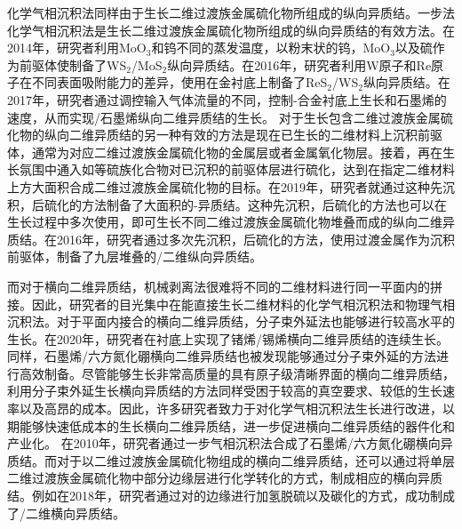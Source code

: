     化学气相沉积法同样由于生长二维过渡族金属硫化物所组成的纵向异质结。一步法化学气相沉积法是生长二维过渡族金属硫化物所组成的纵向异质结的有效方法。在2014年，研究者利用MoO$_3$和钨不同的蒸发温度，以粉末状的钨，MoO$_3$以及硫作为前驱体使制备了WS$_2$/MoS$_2$纵向异质结。在2016年，研究者利用W原子和Re原子在不同表面吸附能力的差异，使用在金衬底上制备了ReS$_2$/WS$_2$纵向异质结。在2017年，研究者通过调控输入气体流量的不同，控制-合金衬底上生长和石墨烯的速度，从而实现/石墨烯纵向二维异质结的生长。
    对于生长包含二维过渡族金属硫化物的纵向二维异质结的另一种有效的方法是现在已生长的二维材料上沉积前驱体，通常为对应二维过渡族金属硫化物的金属层或者金属氧化物层。接着，再在生长氛围中通入如等硫族化合物对已沉积的前驱体层进行硫化，达到在指定二维材料上方大面积合成二维过渡族金属硫化物的目标。在2019年，研究者就通过这种先沉积，后硫化的方法制备了大面积的-异质结。这种先沉积，后硫化的方法也可以在生长过程中多次使用，即可生长不同二维过渡族金属硫化物堆叠而成的纵向二维异质结。在2016年，研究者通过多次先沉积，后硫化的方法，使用过渡金属作为沉积前驱体，制备了九层堆叠的/二维纵向异质结。

    而对于横向二维异质结，机械剥离法很难将不同的二维材料进行同一平面内的拼接。因此，研究者的目光集中在能直接生长二维材料的化学气相沉积法和物理气相沉积法。对于平面内接合的横向二维异质结，分子束外延法也能够进行较高水平的生长。在2020年，研究者在衬底上实现了锗烯/锡烯横向二维异质结的连续生长。同样，石墨烯/六方氮化硼横向二维异质结也被发现能够通过分子束外延的方法进行高效制备。尽管能够生长非常高质量的具有原子级清晰界面的横向二维异质结，利用分子束外延生长横向异质结的方法同样受困于较高的真空要求、较低的生长速率以及高昂的成本。因此，许多研究者致力于对化学气相沉积法生长进行改进，以期能够快速低成本的生长横向二维异质结，进一步促进横向二维异质结的器件化和产业化。
    在2010年，研究者通过一步气相沉积法合成了石墨烯/六方氮化硼横向异质结。而对于以二维过渡族金属硫化物组成的横向二维异质结，还可以通过将单层二维过渡族金属硫化物中部分边缘层进行化学转化的方式，制成相应的横向异质结。例如在2018年，研究者通过对的边缘进行加氢脱硫以及碳化的方式，成功制成了/二维横向异质结。

